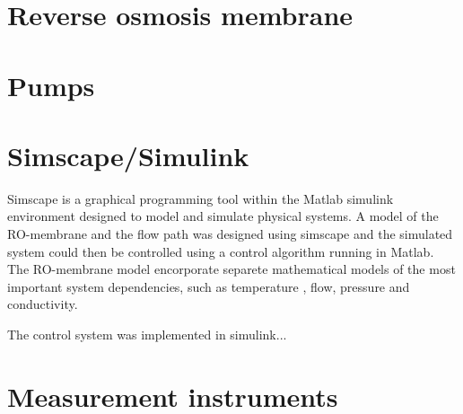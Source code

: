 
\section{Reverse osmosis membrane}


\section{Pumps}

\section{Simscape/Simulink}

Simscape is a graphical programming tool within the Matlab simulink environment designed to model and simulate physical systems. A model of the RO-membrane and the flow path was designed using simscape and the simulated system could then be controlled using a control algorithm running in Matlab.  The RO-membrane model encorporate separete mathematical models of the most important system dependencies, such as temperature  , flow, pressure and conductivity.  

The control system was implemented in simulink...


\section{Measurement instruments}


